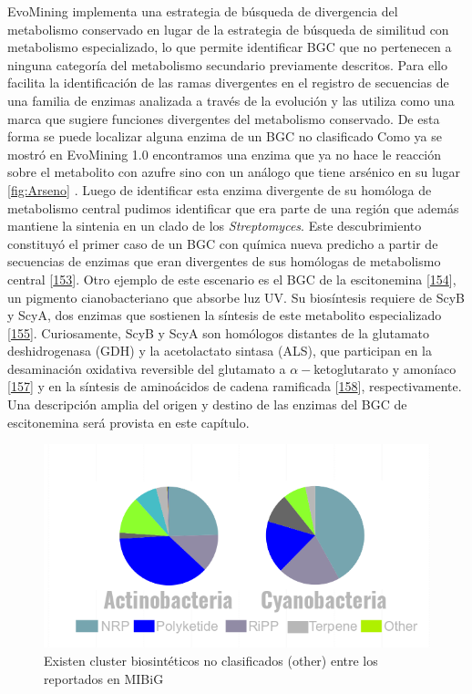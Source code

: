 \documentclass[12pt,twoside]{reedthesis}
\begin{document}
  EvoMining implementa una estrategia de búsqueda de divergencia del
  metabolismo conservado en lugar de la estrategia de búsqueda de
  similitud con metabolismo especializado, lo que permite identificar BGC
  que no pertenecen a ninguna categoría del metabolismo secundario
  previamente descritos. Para ello facilita la identificación de las ramas
  divergentes en el registro de secuencias de una familia de enzimas
  analizada a través de la evolución y las utiliza como una marca que
  sugiere funciones divergentes del metabolismo conservado. De esta forma
  se puede localizar alguna enzima de un BGC no clasificado Como ya se
  mostró en EvoMining 1.0 encontramos una enzima que ya no hace le
  reacción sobre el metabolito con azufre sino con un análogo que tiene
  arsénico en su lugar \autoref{fig:Arseno} . Luego de identificar esta
  enzima divergente de su homóloga de metabolismo central pudimos
  identificar que era parte de una región que además mantiene la sintenia
  en un clado de los \emph{Streptomyces}. Este descubrimiento constituyó
  el primer caso de un BGC con química nueva predicho a partir de
  secuencias de enzimas que eran divergentes de sus homólogas de
  metabolismo central {[}\protect\hyperlink{ref-cruz_tesis_2013}{153}{]}.
  Otro ejemplo de este escenario es el BGC de la escitonemina
  {[}\protect\hyperlink{ref-garciapichel_evidence_1992}{154}{]}, un
  pigmento cianobacteriano que absorbe luz UV. Su biosíntesis requiere de
  ScyB y ScyA, dos enzimas que sostienen la síntesis de este metabolito
  especializado
  {[}\protect\hyperlink{ref-balskus_investigating_2008}{155}{]}.
  Curiosamente, ScyB y ScyA son homólogos distantes de la glutamato
  deshidrogenasa (GDH) y la acetolactato sintasa (ALS), que participan en
  la desaminación oxidativa reversible del glutamato a
  \(\alpha-\)ketoglutarato y amoníaco
  {[}\protect\hyperlink{ref-engel_glutamate_2014}{157}{]} y en la síntesis
  de aminoácidos de cadena ramificada
  {[}\protect\hyperlink{ref-liu_acetohydroxyacid_2016}{158}{]},
  respectivamente. Una descripción amplia del origen y destino de las
  enzimas del BGC de escitonemina será provista en este capítulo.
  
  \begin{figure}[h!tbp]
  \centering
  \includegraphics[angle = 0,scale = .7]{chapter2/other.png}
  \caption[Existen cluster biosintéticos no clasificados (other) entre los reportados en MIBiG]{\footnotesize{Existen cluster biosintéticos no clasificados (other) entre los reportados en MIBiG}}
  \label{fig:other}
  \end{figure}
  
\end{document}
